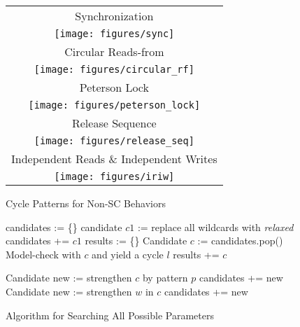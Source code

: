 \begin{figure}[!ht]
\centering
\begin{tabular}{c}
\multicolumn{1}{c}{Synchronization}\\
\texttt{[image: figures/sync]}\\
\multicolumn{1}{c}{Circular Reads-from}\\
\texttt{[image: figures/circular\_rf]}\\
\multicolumn{1}{c}{Peterson Lock}\\
\texttt{[image: figures/peterson\_lock]}\\
\multicolumn{1}{c}{Release Sequence}\\
\texttt{[image: figures/release\_seq]}\\
\multicolumn{1}{c}{Independent Reads \& Independent Writes}\\
\texttt{[image: figures/iriw]}\\
\end{tabular}
\caption{\label{fig:fence_implications}Cycle Patterns for Non-SC Behaviors}
\end{figure}


\begin{figure}[!htbp]
\begin{algorithmic}[1]
\State candidates := \{\}
\State candidate $c1$ := replace all wildcards with \textit{relaxed}
\State candidates += $c1$
\State results := \{\}
\State Candidate $c$ := candidates.pop()
\State Model-check with $c$ and yield a cycle $l$
\State results += $c$
\Else
\State {}
\EndIf
\EndWhile
\State {}
\EndFunction

\State Candidate new := strengthen $c$ by pattern $p$
\State candidates += new 
\Else
{}
\State Candidate new := strengthen $w$ in $c$
\State candidates += new
\EndIf
\EndFor
\EndIf
\EndProcedure

\end{algorithmic}
\caption{\label{fig:algorithm}Algorithm for Searching All Possible Parameters}
\end{figure}


